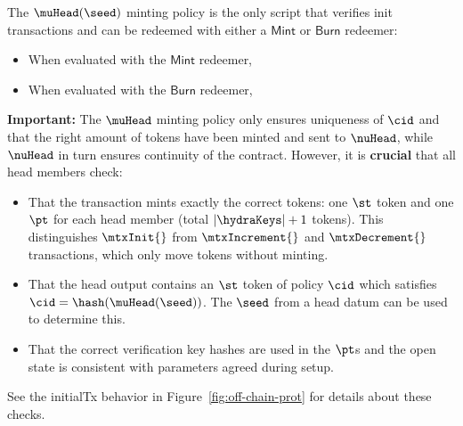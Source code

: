 \noindent The $\muHead(\seed)$ minting policy is the only script that verifies
init transactions and can be redeemed with either a $\mathsf{Mint}$ or
$\mathsf{Burn}$ redeemer:
\begin{itemize}
	\item When evaluated with the $\mathsf{Mint}$ redeemer,
	\item When evaluated with the $\mathsf{Burn}$ redeemer,
\end{itemize}

\noindent \textbf{Important:} The $\muHead$ minting policy only ensures
uniqueness of $\cid$ and that the right amount of tokens have been minted and
sent to $\nuHead$, while $\nuHead$ in turn ensures continuity of the contract.
However, it is \textbf{crucial} that all head members check:
\begin{itemize}
	\item That the transaction mints exactly the correct tokens: one $\st$ token and one $\pt$ for each head member (total $|\hydraKeys| + 1$ tokens). This distinguishes $\mtxInit{}$ from $\mtxIncrement{}$ and $\mtxDecrement{}$ transactions, which only move tokens without minting.
	\item That the head output contains an $\st$ token of policy $\cid$ which satisfies $\cid = \hash(\muHead(\seed))$. The $\seed$ from a head datum can be used to determine this.
	\item That the correct verification key hashes are used in the $\pt$s and the open state is consistent with parameters agreed during setup.
\end{itemize}
See the initialTx behavior in Figure~\ref{fig:off-chain-prot} for details about these checks.\\


